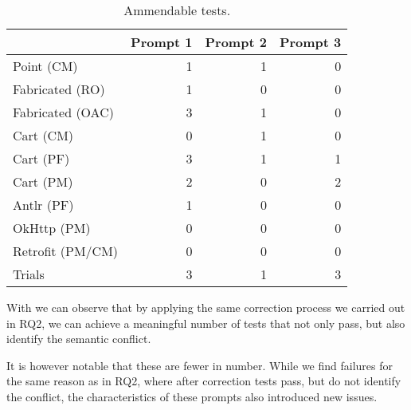 
\begin{table}[t]
    \centering
    \begin{tabular}{@{\extracolsep{\fill}} lrrr} \toprule
                     & Prompt 1 & Prompt 2 & Prompt 3 \\
    \midrule
    Point (CM)       & 1 & 1 & 0 \\
    Fabricated (RO)  & 1 & 0  & 0 \\
    Fabricated (OAC) & 3 & 1 & 0 \\
    Cart (CM)        & 0 & 1 & 0 \\
    Cart (PF)        & 3 & 1  & 1 \\
    Cart (PM)        & 2 & 0 & 2 \\
    Antlr (PF)       & 1 & 0  & 0 \\
    OkHttp (PM)      & 0 & 0  & 0 \\
    Retrofit (PM/CM) & 0 & 0  & 0 \\
    Trials           & 3 & 1 & 3 \\
    \bottomrule
    \end{tabular}
    \caption{Ammendable tests.\label{tab:results:rq3t2}}
\end{table}

With  we can observe that by applying the same correction process we carried out in
RQ2, we can achieve a meaningful number of tests that not only pass, but also identify the semantic conflict.

It is however notable that these are fewer in number. While we find failures for the same reason as in RQ2, where
after correction tests pass, but do not identify the conflict, the characteristics of these prompts also introduced
new issues.

